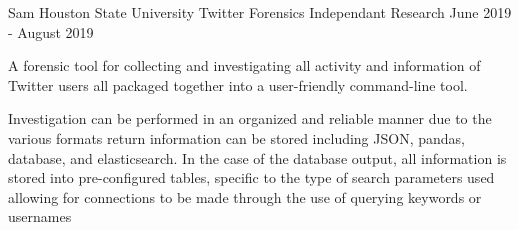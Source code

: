 \begin{cventries}
    \cventry
      {Sam Houston State University} %
      {Twitter Forensics} %
	  {Independant Research} %
      {June 2019 - August 2019} %
      {
        \begin{cvitems} %
          \item {A forensic tool for collecting and investigating all activity and information of Twitter users all packaged together into a user-friendly command-line tool.}
          \item {Investigation can be performed in an organized and reliable manner due to the various formats return information can be stored including JSON, pandas, database, and elasticsearch. In the case of the database output, all information is stored into pre-configured tables, specific to the type of search parameters used allowing for connections to be made through the use of querying keywords or usernames}
       \end{cvitems}
      }

\end{cventries}
